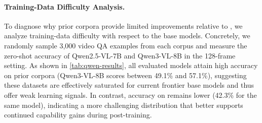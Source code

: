 
\vspace{-8pt}
\paragraph{Training-Data Difficulty Analysis.}
To diagnose why prior corpora provide limited improvements relative to \ours, we analyze training-data difficulty with respect to the base models. Concretely, we randomly sample 3,000 video QA examples from each corpus and measure the zero-shot accuracy of Qwen2.5-VL-7B and Qwen3-VL-8B in the 128-frame setting. As shown in \autoref{tab:qwen-results}, all evaluated models attain high accuracy on prior corpora (\eg Qwen3-VL-8B scores between 49.1\% and 57.1\%), suggesting these datasets are effectively saturated for current frontier base models and thus offer weak learning signals. In contrast, accuracy on \ours remains lower (42.3\% for the same model), indicating a more challenging distribution that better supports continued capability gains during post-training.
